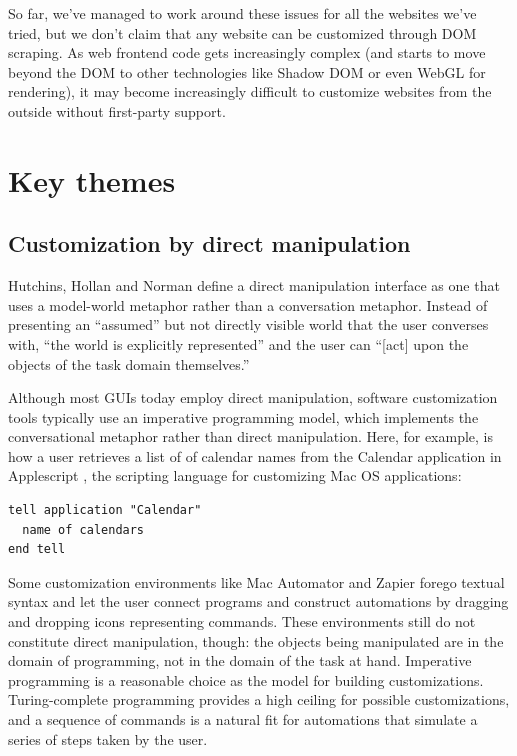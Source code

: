 \documentclass[sigplan,10pt,anonymous,review]{acmart}
\begin{document}
So far, we've managed to work around these issues for all the websites
we've tried, but we don't claim that any website can be customized
through DOM scraping. As web frontend code gets increasingly complex
(and starts to move beyond the DOM to other technologies like Shadow DOM
or even WebGL for rendering), it may become increasingly difficult to
customize websites from the outside without first-party support.

\hypertarget{sec:themes}{%
\section{Key themes}\label{sec:themes}}

\hypertarget{sec:dm}{%
\subsection{Customization by direct manipulation}\label{sec:dm}}

Hutchins, Hollan and Norman \citep{hutchins1985} define a direct
manipulation interface as one that uses a model-world metaphor rather
than a conversation metaphor. Instead of presenting an ``assumed'' but
not directly visible world that the user converses with, ``the world is
explicitly represented'' and the user can ``{[}act{]} upon the objects
of the task domain themselves.''

Although most GUIs today employ direct manipulation, software
customization tools typically use an imperative programming model, which
implements the conversational metaphor rather than direct manipulation.
Here, for example, is how a user retrieves a list of of calendar names
from the Calendar application in Applescript \citep{cook2007}, the
scripting language for customizing Mac OS applications:

\begin{verbatim}
tell application "Calendar"
  name of calendars
end tell
\end{verbatim}

Some customization environments like Mac Automator and Zapier forego
textual syntax and let the user connect programs and construct
automations by dragging and dropping icons representing commands. These
environments still do not constitute direct manipulation, though: the
objects being manipulated are in the domain of programming, not in the
domain of the task at hand. Imperative programming is a reasonable
choice as the model for building customizations. Turing-complete
programming provides a high ceiling for possible customizations, and a
sequence of commands is a natural fit for automations that simulate a
series of steps taken by the user.
\end{document}

